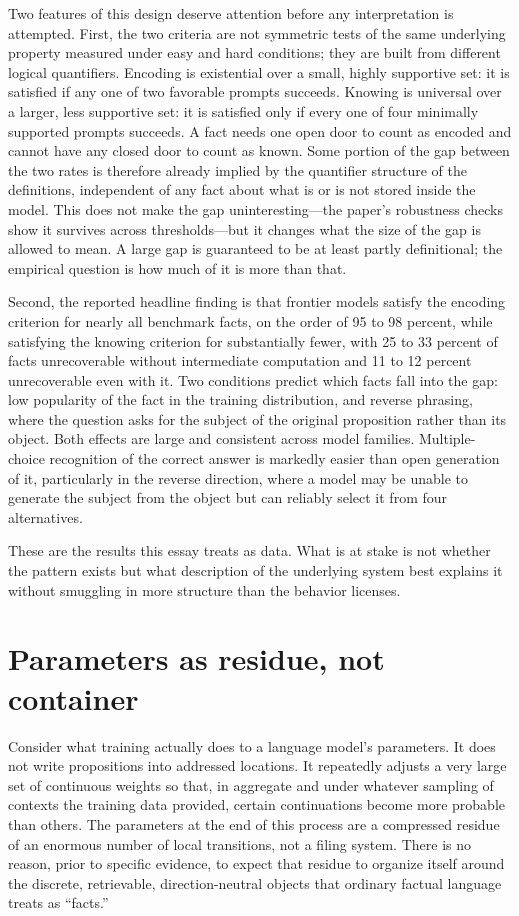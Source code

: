 \documentclass[11pt]{article}
\begin{document}
Two features of this design deserve attention before any interpretation is attempted. First, the two criteria are not symmetric tests of the same underlying property measured under easy and hard conditions; they are built from different logical quantifiers. Encoding is existential over a small, highly supportive set: it is satisfied if any one of two favorable prompts succeeds. Knowing is universal over a larger, less supportive set: it is satisfied only if every one of four minimally supported prompts succeeds. A fact needs one open door to count as encoded and cannot have any closed door to count as known. Some portion of the gap between the two rates is therefore already implied by the quantifier structure of the definitions, independent of any fact about what is or is not stored inside the model. This does not make the gap uninteresting---the paper's robustness checks show it survives across thresholds---but it changes what the size of the gap is allowed to mean. A large gap is guaranteed to be at least partly definitional; the empirical question is how much of it is more than that.

Second, the reported headline finding is that frontier models satisfy the encoding criterion for nearly all benchmark facts, on the order of 95 to 98 percent, while satisfying the knowing criterion for substantially fewer, with 25 to 33 percent of facts unrecoverable without intermediate computation and 11 to 12 percent unrecoverable even with it. Two conditions predict which facts fall into the gap: low popularity of the fact in the training distribution, and reverse phrasing, where the question asks for the subject of the original proposition rather than its object. Both effects are large and consistent across model families. Multiple-choice recognition of the correct answer is markedly easier than open generation of it, particularly in the reverse direction, where a model may be unable to generate the subject from the object but can reliably select it from four alternatives.

These are the results this essay treats as data. What is at stake is not whether the pattern exists but what description of the underlying system best explains it without smuggling in more structure than the behavior licenses.

\section{Parameters as residue, not container}

Consider what training actually does to a language model's parameters. It does not write propositions into addressed locations. It repeatedly adjusts a very large set of continuous weights so that, in aggregate and under whatever sampling of contexts the training data provided, certain continuations become more probable than others. The parameters at the end of this process are a compressed residue of an enormous number of local transitions, not a filing system. There is no reason, prior to specific evidence, to expect that residue to organize itself around the discrete, retrievable, direction-neutral objects that ordinary factual language treats as ``facts.''
\end{document}
